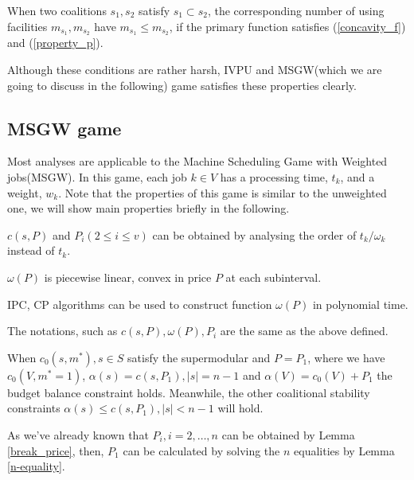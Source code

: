 \begin{thm}\label{machine_num}
When two coalitions $s_1,s_2$ satisfy $s_1 \subset s_2$, the corresponding number of using facilities $ m_{s_1}, m_{s_2}$ have $m_{s_1} \leq m_{s_2}$, if the primary function satisfies  (\ref{concavity_f}) and (\ref{property_p}).
\end{thm}

Although these conditions are rather harsh, IVPU and MSGW(which we are going to discuss in the following) game satisfies these properties clearly.

\subsection*{MSGW game}
Most analyses are applicable to the Machine Scheduling Game with Weighted jobs(MSGW).
In this game, each job $k \in V$ has a processing time, $t_k$, and a weight, $w_k$.
Note that the properties of this game is similar to the unweighted one, we will show main properties briefly in the following.

\begin{corollary} \label{cor-1}
$c(s,P)$ and $P_i(2 \leq i \leq v)$ can be obtained by analysing the order of $t_k/\omega_k$ instead of $t_k$.

\end{corollary}

\begin{corollary} \label{cor-2}
  $\omega(P)$ is piecewise linear, convex in price $P$ at each subinterval.
\end{corollary}

\begin{corollary} \label{cor-3}
  IPC, CP algorithms can be used to construct function $\omega(P)$ in polynomial time.
\end{corollary}

The notations, such as $c(s,P), \omega(P), P_i$ are the same as the above defined.

\begin{lem}\label{n-equality}
When $c_0(s,m^*), s \in S$ satisfy the supermodular and $P=P_1$, where we have $c_0(V,m^* = 1)$, $\alpha(s)=c(s, P_1), \left| s \right|= n-1$ and $\alpha(V)=c_0(V)+P_1$ the budget balance constraint holds. Meanwhile, the other coalitional stability constraints $\alpha(s) \leq c(s, P_1), \left| s \right| < n-1$ will hold.
\end{lem}

As we've already known that $P_i, i = 2,\ldots,n$ can be obtained by Lemma \ref{break_price}, then, $P_1$ can be calculated by solving the $n$ equalities by Lemma \ref{n-equality}.

